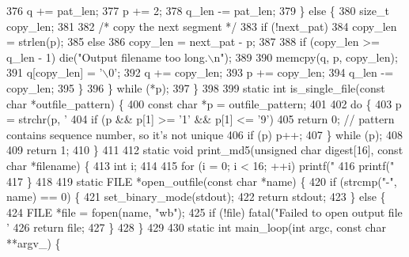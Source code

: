 \begin{DoxyCodeInclude}
{{{{{{{{{{{{{{{{{{{{{376       q += pat\_len;
377       p += 2;
378       q\_len -= pat\_len;
379     \} \textcolor{keywordflow}{else} \{
380       \textcolor{keywordtype}{size\_t} copy\_len;
381 
382       \textcolor{comment}{/* copy the next segment */}
383       \textcolor{keywordflow}{if} (!next\_pat)
384         copy\_len = strlen(p);
385       \textcolor{keywordflow}{else}
386         copy\_len = next\_pat - p;
387 
388       \textcolor{keywordflow}{if} (copy\_len >= q\_len - 1) die(\textcolor{stringliteral}{"Output filename too long.\(\backslash\)n"});
389 
390       memcpy(q, p, copy\_len);
391       q[copy\_len] = \textcolor{charliteral}{'\(\backslash\)0'};
392       q += copy\_len;
393       p += copy\_len;
394       q\_len -= copy\_len;
395     \}
396   \} \textcolor{keywordflow}{while} (*p);
397 \}
398 
399 \textcolor{keyword}{static} \textcolor{keywordtype}{int} is\_single\_file(\textcolor{keyword}{const} \textcolor{keywordtype}{char} *outfile\_pattern) \{
400   \textcolor{keyword}{const} \textcolor{keywordtype}{char} *p = outfile\_pattern;
401 
402   \textcolor{keywordflow}{do} \{
403     p = strchr(p, \textcolor{charliteral}{'%
404     \textcolor{keywordflow}{if} (p && p[1] >= \textcolor{charliteral}{'1'} && p[1] <= \textcolor{charliteral}{'9'})
405       \textcolor{keywordflow}{return} 0;  \textcolor{comment}{// pattern contains sequence number, so it's not unique}
406     \textcolor{keywordflow}{if} (p) p++;
407   \} \textcolor{keywordflow}{while} (p);
408 
409   \textcolor{keywordflow}{return} 1;
410 \}
411 
412 \textcolor{keyword}{static} \textcolor{keywordtype}{void} print\_md5(\textcolor{keywordtype}{unsigned} \textcolor{keywordtype}{char} digest[16], \textcolor{keyword}{const} \textcolor{keywordtype}{char} *filename) \{
413   \textcolor{keywordtype}{int} i;
414 
415   \textcolor{keywordflow}{for} (i = 0; i < 16; ++i) printf(\textcolor{stringliteral}{"%
416   printf(\textcolor{stringliteral}{"  %
417 \}
418 
419 \textcolor{keyword}{static} FILE *open\_outfile(\textcolor{keyword}{const} \textcolor{keywordtype}{char} *name) \{
420   \textcolor{keywordflow}{if} (strcmp(\textcolor{stringliteral}{"-"}, name) == 0) \{
421     set\_binary\_mode(stdout);
422     \textcolor{keywordflow}{return} stdout;
423   \} \textcolor{keywordflow}{else} \{
424     FILE *file = fopen(name, \textcolor{stringliteral}{"wb"});
425     \textcolor{keywordflow}{if} (!file) fatal(\textcolor{stringliteral}{"Failed to open output file '%
426     \textcolor{keywordflow}{return} file;
427   \}
428 \}
429 
430 \textcolor{keyword}{static} \textcolor{keywordtype}{int} main\_loop(\textcolor{keywordtype}{int} argc, \textcolor{keyword}{const} \textcolor{keywordtype}{char} **argv\_) \{
}}}}}}}}}}}}}}}}}}}}}}}}}
\end{DoxyCodeInclude}
